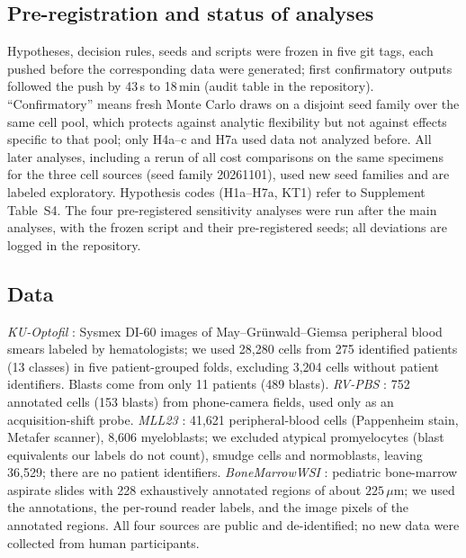 \documentclass[journal]{IEEEtran}
\begin{document}
\subsection{Pre-registration and status of analyses}
Hypotheses, decision rules, seeds and scripts were frozen in five git tags, each pushed before the corresponding data were generated; first confirmatory outputs followed the push by 43\,s to 18\,min (audit table in the repository). ``Confirmatory'' means fresh Monte Carlo draws on a disjoint seed family over the same cell pool, which protects against analytic flexibility but not against effects specific to that pool; only H4a--c and H7a used data not analyzed before. All later analyses, including a rerun of all cost comparisons on the same specimens for the three cell sources (seed family 20261101), used new seed families and are labeled exploratory. Hypothesis codes (H1a--H7a, KT1) refer to Supplement Table~S4. The four pre-registered sensitivity analyses were run after the main analyses, with the frozen script and their pre-registered seeds; all deviations are logged in the repository.

\subsection{Data}
\emph{KU-Optofil} \cite{yarikan2026kuoptofil}: Sysmex DI-60 images of May--Gr\"unwald--Giemsa peripheral blood smears labeled by hematologists; we used 28,280 cells from 275 identified patients (13 classes) in five patient-grouped folds, excluding 3,204 cells without patient identifiers. Blasts come from only 11 patients (489 blasts). \emph{RV-PBS} \cite{rvpbs2024}: 752 annotated cells (153 blasts) from phone-camera fields, used only as an acquisition-shift probe. \emph{MLL23} \cite{shetabboushehri2025mll23}: 41,621 peripheral-blood cells (Pappenheim stain, Metafer scanner), 8,606 myeloblasts; we excluded atypical promyelocytes (blast equivalents our labels do not count), smudge cells and normoblasts, leaving 36,529; there are no patient identifiers. \emph{BoneMarrowWSI} \cite{hofener2025bmwsi,hofener2025descriptor}: pediatric bone-marrow aspirate slides with 228 exhaustively annotated regions of about $225\,\mu$m; we used the annotations, the per-round reader labels, and the image pixels of the annotated regions. All four sources are public and de-identified; no new data were collected from human participants.
\end{document}
